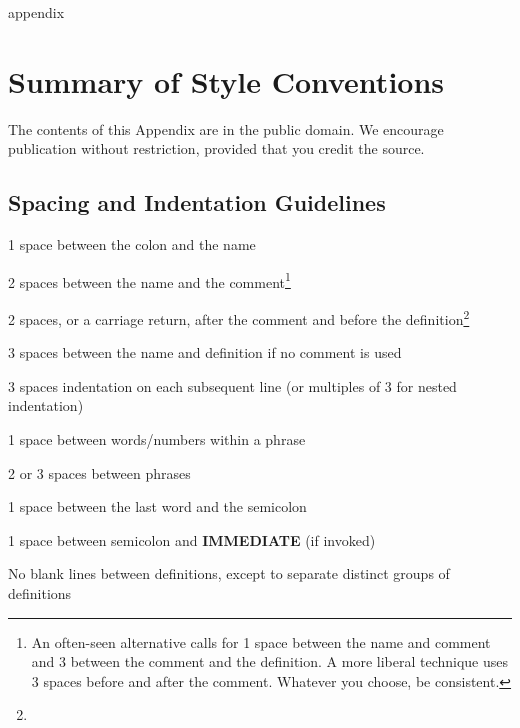 appendix{}
\chapter{
Summary of
Style Conventions
}
The contents of this Appendix are in the public domain. We encourage
publication without restriction, provided that you credit the source.
\section{Spacing and Indentation Guidelines}
\begin{list}
{}{\setlength{\parsep}{0cm}}
\item 1 space between the colon and the name
\item 2 spaces between the name and the comment\footnote{
An often-seen alternative calls for 1 space between the name and comment and 3 between
the comment and the definition. A more liberal technique uses 3 spaces before and after the
comment. Whatever you choose, be consistent.
}
\item 2 spaces, or a carriage return, after the comment and before the definition\footnote[1]{}
\item 3 spaces between the name and definition if no comment is used
\item 3 spaces indentation on each subsequent line (or multiples of 3 for nested indentation)
\item 1 space between words/numbers within a phrase
\item 2 or 3 spaces between phrases
\item 1 space between the last word and the semicolon
\item 1 space between semicolon and {\bf IMMEDIATE} (if invoked)
\end{list}
No blank lines between definitions, except to separate distinct groups of
definitions

